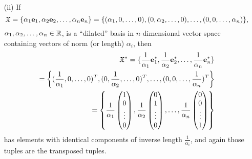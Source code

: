 {\begin{itemize}
\item[(ii)]
If $$
{\frak X}
=
\{\alpha_1 {\bf e}_1, \alpha_2 {\bf e}_2,\ldots ,\alpha_n {\bf e}_n\}
=
\{
(\alpha_1 ,0,\ldots,0),
(0,\alpha_2 ,\ldots,0),
\ldots,
(0,0,\ldots,\alpha_n )
\},
$$  $\alpha_1,\alpha_2,\ldots ,\alpha_n \in {\Bbb R}$,
is a ``dilated'' basis in $n$-dimensional vector space containing vectors of norm (or length) $\alpha_i$,
then
\begin{equation}
\begin{split}
{\frak X}^*
=\{\frac{1}{\alpha_1 }{\bf e}_1^* ,\frac{1}{\alpha_2 }{\bf e}_2^*, \ldots ,\frac{1}{\alpha_n }{\bf e}_n^* \}\\
=\left\{
(\frac{1}{\alpha_1 },0,\ldots,0)^T,
(0,\frac{1}{\alpha_2 },\ldots,0)^T,
\ldots,
(0,0,\ldots,\frac{1}{\alpha_n })^T\right\}  \\
=  \left\{
\frac{1}{\alpha_1 }
\begin{pmatrix}
1\\
0\\
\vdots \\
0
\end{pmatrix}
,
\frac{1}{\alpha_2 }
\begin{pmatrix}
0\\
1\\
\vdots \\
0
\end{pmatrix}
,
\ldots ,
\frac{1}{\alpha_n }
\begin{pmatrix}
0\\
0\\
\vdots \\
1
\end{pmatrix}
\right\}
\end{split}
\end{equation}
has elements with identical components of inverse length $\frac{1}{\alpha_i }$,
and again those tuples are the transposed tuples.


\end{itemize}}
